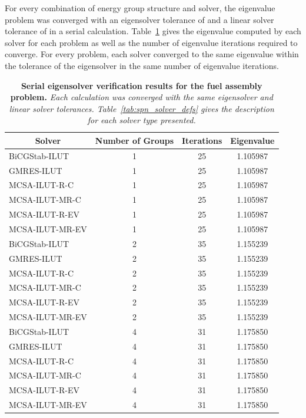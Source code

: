 For every combination of energy group structure and solver, the
eigenvalue problem was converged with an eigensolver tolerance of
 and a linear solver tolerance of  in a serial
calculation. Table~\ref{tab:serial_ev_results} gives the eigenvalue
computed by each solver for each problem as well as the number of
eigenvalue iterations required to converge. For every problem, each
solver converged to the same eigenvalue within the tolerance of the
eigensolver in the same number of eigenvalue iterations.
\begin{table}[h!]
  \begin{center}
    \begin{tabular}{lccc}\hline\hline
      \multicolumn{1}{c}{\textbf{Solver}} & 
      \multicolumn{1}{c}{\textbf{Number of Groups}} & 
      \multicolumn{1}{c}{\textbf{Iterations}} &
      \multicolumn{1}{c}{\textbf{Eigenvalue}} \\
      \hline
      BiCGStab-ILUT & 1 & 25 & 1.105987 \\
      GMRES-ILUT & 1 & 25 & 1.105987 \\
      MCSA-ILUT-R-C & 1 & 25 & 1.105987 \\
      MCSA-ILUT-MR-C & 1 & 25 & 1.105987 \\
      MCSA-ILUT-R-EV & 1 & 25 & 1.105987 \\
      MCSA-ILUT-MR-EV & 1 & 25 & 1.105987 \\
      \hline
      BiCGStab-ILUT & 2 & 35 & 1.155239 \\
      GMRES-ILUT & 2 & 35 & 1.155239 \\
      MCSA-ILUT-R-C & 2 & 35 & 1.155239 \\
      MCSA-ILUT-MR-C & 2 & 35 & 1.155239 \\
      MCSA-ILUT-R-EV & 2 & 35 & 1.155239 \\
      MCSA-ILUT-MR-EV & 2 & 35 & 1.155239 \\
      \hline
      BiCGStab-ILUT & 4 & 31 & 1.175850 \\
      GMRES-ILUT & 4 & 31 & 1.175850 \\
      MCSA-ILUT-R-C & 4 & 31 & 1.175850 \\
      MCSA-ILUT-MR-C & 4 & 31 & 1.175850 \\
      MCSA-ILUT-R-EV & 4 & 31 & 1.175850 \\
      MCSA-ILUT-MR-EV & 4 & 31 & 1.175850 \\
      \hline\hline
    \end{tabular}
  \end{center}
  \caption{\textbf{Serial eigensolver verification results for the
      fuel assembly problem.} \textit{Each calculation was converged
      with the same eigensolver and linear solver
      tolerances. Table~\ref{tab:spn_solver_defs} gives the
      description for each solver type presented.}}
  \label{tab:serial_ev_results}
\end{table}

